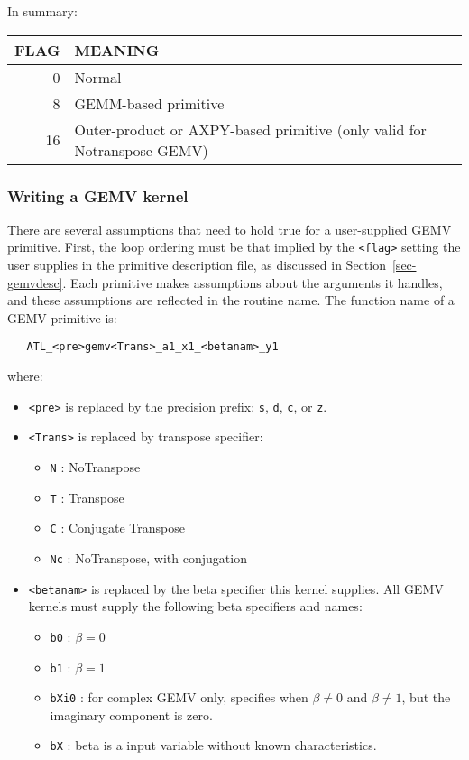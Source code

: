 \documentclass[11pt]{article}
\begin{document}
{In summary:
\begin{table}[h]
\begin{tabular}{||r|l||}\hline\hline
FLAG & MEANING \\\hline\hline
   0 & Normal \\\hline
   8 & GEMM-based primitive \\\hline
  16 & Outer-product or AXPY-based primitive (only valid for Notranspose GEMV) \\\hline \hline
\end{tabular}
\end{table}

\subsubsection{Writing a GEMV kernel}

There are several assumptions that need to hold true for a user-supplied GEMV
primitive.  First, the loop ordering must be that implied by the 
\verb+<flag>+ setting
the user supplies in the primitive description file, as discussed in
Section~\ref{sec-gemvdesc}.  
Each primitive makes assumptions about the arguments it handles,
and these assumptions are reflected in the routine name.  The function name of
a GEMV primitive is:
\begin{verbatim}
   ATL_<pre>gemv<Trans>_a1_x1_<betanam>_y1
\end{verbatim}
where:
\begin{itemize}
\item \verb+<pre>+ is replaced by the precision prefix:  
      {\tt s}, {\tt d}, {\tt c}, or {\tt z}.
\item \verb+<Trans>+ is replaced by transpose specifier:
  \begin{itemize}
   \item {\tt N} : NoTranspose
   \item {\tt T} : Transpose
   \item {\tt C} : Conjugate Transpose
   \item {\tt Nc} : NoTranspose, with conjugation
  \end{itemize}
\item \verb+<betanam>+ is replaced by the beta specifier this kernel
supplies.  All GEMV kernels must supply the following beta specifiers and
names:
  \begin{itemize}
     \item {\tt b0} : $\beta = 0$
     \item {\tt b1} : $\beta = 1$
     \item {\tt bXi0} : for complex GEMV only, specifies when 
$\beta \neq 0$ and $\beta \neq 1$, but the imaginary component is zero.
     \item {\tt bX} : beta is a input variable without known characteristics.
  \end{itemize}
\end{itemize}

}
\end{document}
